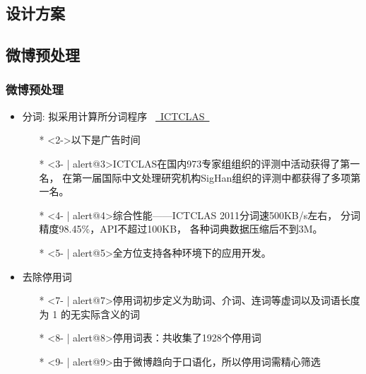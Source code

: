 \documentclass[CJKutf8, table, handout]{beamer}
\begin{document}
\begin{CJK}{UTF8}{gbsn}
\section{设计方案}
\subsection{微博预处理}
\begin{frame}
  \frametitle{微博预处理}
  \begin{itemize}
    \item<1- | alert@1>{分词: 拟采用计算所分词程序
      ~\href{http://ictclas.org/}{~ICTCLAS~}}
      \begin{itemize}
        \item[*]<2->{以下是广告时间\smiley}
        \item[*]<3- | alert@3>{ICTCLAS在国内973专家组组织的评测中活动获得了第一名，
          在第一届国际中文处理研究机构SigHan组织的评测中都获得了多项第一名。}
        \item[*]<4- | alert@4>{综合性能——ICTCLAS 2011分词速500KB/s左右，
          分词精度98.45\%，API不超过100KB，
          各种词典数据压缩后不到3M。}
        \item[*]<5- | alert@5>{全方位支持各种环境下的应用开发。}
      \end{itemize}
    \item<6- | alert@6>{去除停用词}
      \begin{itemize}
        \item[*]<7- | alert@7>{停用词初步定义为助词、介词、连词等虚词以及词语长度为
          1 的无实际含义的词}
        \item[*]<8- | alert@8>{停用词表：共收集了1928个停用词}
        \item[*]<9- | alert@9>{由于微博趋向于口语化，所以停用词需精心筛选}
      \end{itemize}
  \end{itemize}
\end{frame}


\end{CJK}
\end{document}
